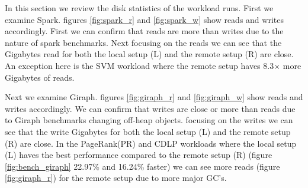 \par In this section we review the disk statistics of the workload runs. First we examine Spark. figures \ref{fig:spark_r} and \ref{fig:spark_w} show reads and writes accordingly. First we can confirm that reads are more than writes due to the nature of spark benchmarks. Next focusing on the reads we can see that the Gigabytes read for both the local setup (L) and the remote setup (R) are close. An exception here is the SVM workload where the remote setup haves 8.3× more Gigabytes of reads.
\par Next we examine Giraph. figures \ref{fig:giraph_r} and \ref{fig:giraph_w} show reads and writes accordingly. We can confirm that writes are close or more than reads due to Giraph benchmarks changing off-heap objects. focusing on the writes we can see that the write Gigabytes for both the local setup (L) and the remote setup (R) are close. In the PageRank(PR)	and CDLP workloads where the local setup (L) haves the best performance compared to the remote setup (R) (figure \ref{fig:bench_giraph} 22.97\% and 16.24\% faster) we can see more reads (figure \ref{fig:giraph_r}) for the remote setup due to more major GC's.

